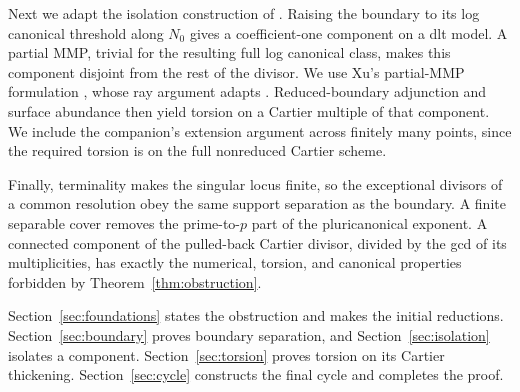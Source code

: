 Next we adapt the isolation construction of
\cite[Section~2.3]{Companion}. Raising the boundary to its log canonical
threshold along $N_0$ gives a coefficient-one component on a dlt model.
A partial MMP, trivial for the resulting full log canonical class,
makes this component disjoint from the rest of the divisor.
We use Xu's partial-MMP formulation
\cite[Section~2.3]{XuNuTwo}, whose ray argument adapts
\cite[Lemma~5.1]{KMM}. Reduced-boundary adjunction and surface
abundance \cite{Tanaka,Posva} then yield torsion on a Cartier
multiple of that component. We include the companion's extension
argument across finitely many points, since the required torsion is
on the full nonreduced Cartier scheme.

Finally, terminality makes the singular locus finite, so the exceptional
divisors of a common resolution obey the same support separation as
the boundary. A finite separable cover removes the prime-to-$p$ part
of the pluricanonical exponent. A connected component of the pulled-back
Cartier divisor, divided by the gcd of its multiplicities, has exactly
the numerical, torsion, and canonical properties forbidden by
Theorem~\ref{thm:obstruction}.

Section~\ref{sec:foundations} states the obstruction and makes the
initial reductions. Section~\ref{sec:boundary} proves boundary
separation, and Section~\ref{sec:isolation} isolates a component.
Section~\ref{sec:torsion} proves torsion on its Cartier thickening.
Section~\ref{sec:cycle} constructs the final cycle and completes the
proof.

